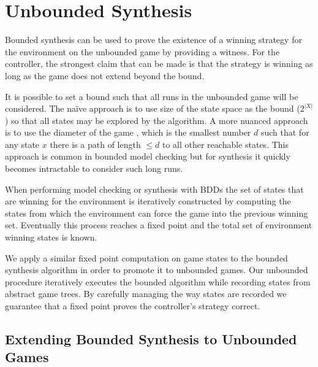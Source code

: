 \documentclass{llncs}
\begin{document}
\section{Unbounded Synthesis}

\label{sect:unbounded}

Bounded synthesis can be used to prove the existence of a winning strategy for
the environment on the unbounded game by providing a witness. For the
controller, the strongest claim that can be made is that the strategy is
winning as long as the game does not extend beyond the bound.

It is possible to set a bound such that all runs in the unbounded game will be
considered. The na\"ive approach is to use size of the state space as the bound
($2^{|X|}$) so that all states may be explored by the algorithm. A more nuanced
approach is to use the diameter of the game \cite{biere1999}, which is the
smallest number $d$ such that for any state $x$ there is a path of length $\leq
d$ to all other reachable states. This approach is common in bounded model
checking but for synthesis it quickly becomes intractable to consider such long
runs.

When performing model checking or synthesis with BDDs \cite{burch1990} the set
of states that are winning for the environment is iteratively constructed by
computing the states from which the environment can force the game into the
previous winning set. Eventually this process reaches a fixed point and the
total set of environment winning states is known.

We apply a similar fixed point computation on game states to the bounded
synthesis algorithm in order to promote it to unbounded games. Our unbounded
procedure iteratively executes the bounded algorithm while recording states
from abstract game trees. By carefully managing the way states are recorded we
guarantee that a fixed point proves the controller's strategy correct.

\subsection{Extending Bounded Synthesis to Unbounded Games}
\end{document}

